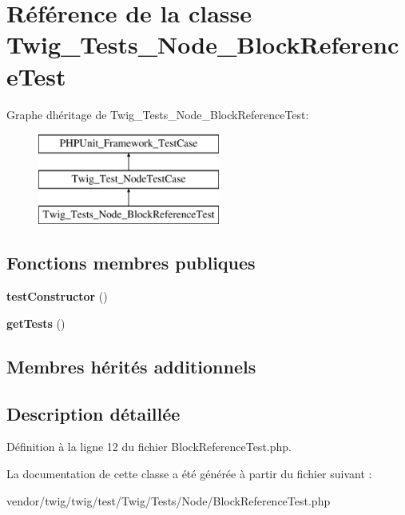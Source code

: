 \hypertarget{class_twig___tests___node___block_reference_test}{}\section{Référence de la classe Twig\+\_\+\+Tests\+\_\+\+Node\+\_\+\+Block\+Reference\+Test}
\label{class_twig___tests___node___block_reference_test}
Graphe d\textquotesingle{}héritage de Twig\+\_\+\+Tests\+\_\+\+Node\+\_\+\+Block\+Reference\+Test\+:\begin{figure}[H]
\begin{center}
\leavevmode
\includegraphics[height=3.000000cm]{class_twig___tests___node___block_reference_test}
\end{center}
\end{figure}
\subsection*{Fonctions membres publiques}
\begin{DoxyCompactItemize}
\item 
{\bfseries test\+Constructor} ()\hypertarget{class_twig___tests___node___block_reference_test_a47094dc941e72950570900d1418f89c6}{}\label{class_twig___tests___node___block_reference_test_a47094dc941e72950570900d1418f89c6}

\item 
{\bfseries get\+Tests} ()\hypertarget{class_twig___tests___node___block_reference_test_a7e247dd31cc8d37a6c97353a062a0080}{}\label{class_twig___tests___node___block_reference_test_a7e247dd31cc8d37a6c97353a062a0080}

\end{DoxyCompactItemize}
\subsection*{Membres hérités additionnels}


\subsection{Description détaillée}


Définition à la ligne 12 du fichier Block\+Reference\+Test.\+php.



La documentation de cette classe a été générée à partir du fichier suivant \+:\begin{DoxyCompactItemize}
\item 
vendor/twig/twig/test/\+Twig/\+Tests/\+Node/Block\+Reference\+Test.\+php\end{DoxyCompactItemize}
